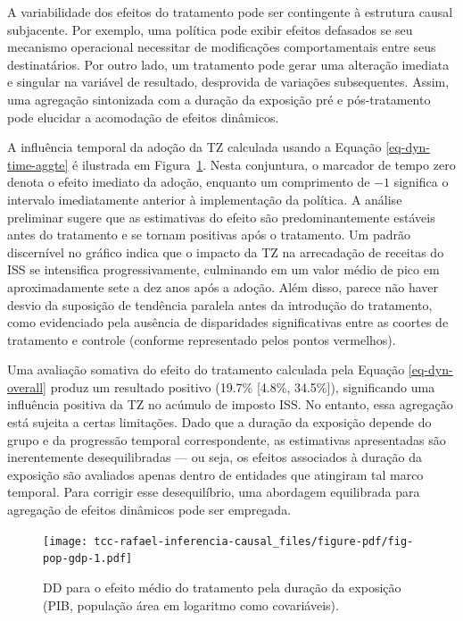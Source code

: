 \documentclass[12pt, a4paper, twoside]{article}
\numberwithin{equation}{subsection} %
\begin{document}
A variabilidade dos efeitos do tratamento pode ser contingente à
estrutura causal subjacente. Por exemplo, uma política pode exibir
efeitos defasados \hspace{0pt}\hspace{0pt}se seu mecanismo operacional
necessitar de modificações comportamentais entre seus destinatários. Por
outro lado, um tratamento pode gerar uma alteração imediata e singular
na variável de resultado, desprovida de variações subsequentes. Assim,
uma agregação sintonizada com a duração da exposição pré e
pós-tratamento pode elucidar a acomodação de efeitos dinâmicos.

A influência temporal da adoção da TZ calculada usando a Equação
\eqref{eq-dyn-time-aggte} é ilustrada em Figura~\ref{fig-pop-gdp}. Nesta
conjuntura, o marcador de tempo zero denota o efeito imediato da adoção,
enquanto um comprimento de \(-1\) significa o intervalo imediatamente
anterior à implementação da política. A análise preliminar sugere que as
estimativas do efeito são predominantemente estáveis
\hspace{0pt}\hspace{0pt}antes do tratamento e se tornam positivas após o
tratamento. Um padrão discernível no gráfico indica que o impacto da TZ
na arrecadação de receitas do ISS se intensifica progressivamente,
culminando em um valor médio de pico em aproximadamente sete a dez anos
após a adoção. Além disso, parece não haver desvio da suposição de
tendência paralela antes da introdução do tratamento, como evidenciado
pela ausência de disparidades significativas entre as coortes de
tratamento e controle (conforme representado pelos pontos vermelhos).

Uma avaliação somativa do efeito do tratamento calculada pela Equação
\eqref{eq-dyn-overall} produz um resultado positivo (19.7\% {[}4.8\%,
34.5\%{]}), significando uma influência positiva da TZ no acúmulo de
imposto ISS. No entanto, essa agregação está sujeita a certas
limitações. Dado que a duração da exposição depende do grupo e da
progressão temporal correspondente, as estimativas apresentadas são
inerentemente desequilibradas --- ou seja, os efeitos associados à
duração da exposição são avaliados apenas dentro de entidades que
atingiram tal marco temporal. Para corrigir esse desequilíbrio, uma
abordagem equilibrada para agregação de efeitos dinâmicos pode ser
empregada.

\begin{figure}[H]

{\centering \texttt{[image: tcc-rafael-inferencia-causal\_files/figure-pdf/fig-pop-gdp-1.pdf]}

}

\caption{\label{fig-pop-gdp}DD para o efeito médio do tratamento pela
duração da exposição (PIB, população área em logaritmo como
covariáveis).}

\end{figure}
\end{document}
